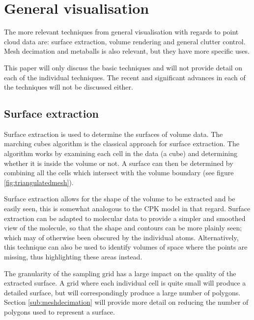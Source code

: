 

\section{General visualisation}
\label{sec:generalvis}


The more relevant techniques from general visualisation with regards to point
cloud data are: surface extraction, volume rendering and general clutter
control. Mesh decimation and metaballs is also relevant, but they have more
specific uses.

This paper will only discuss the basic techniques and will not provide detail
on each of the individual techniques. The recent and significant advances in
each of the techniques will not be discussed either.


\subsection{Surface extraction}
\label{sub:surfaceextraction}

Surface extraction is used to determine the surfaces of volume data. The
marching cubes algorithm \citep{lorensen87} is the classical approach for
surface extraction. The algorithm works by examining each cell in the data (a
cube) and determining whether it is inside the volume or not. A surface can
then be determined by combining all the cells which intersect with the volume
boundary (see figure \ref{fig:triangulatedmesh}).

Surface extraction allows for the shape of the volume to be extracted and be
easily seen, this is somewhat analogous to the CPK model in that regard.
Surface extraction can be adapted to molecular data to provide a simpler and
smoothed view of the molecule, so that the shape and contours can be more
plainly seen; which may of otherwise been obscured by the individual atoms.
Alternatively, this technique can also be used to identify volumes of space
where the points are missing, thus highlighting these areas instead.

The granularity of the sampling grid has a large impact on the quality of the
extracted surface. A grid where each individual cell is quite small will
produce a detailed surface, but will correspondingly produce a large number of
polygons. Section \ref{sub:meshdecimation} will provide more detail on reducing
the number of polygons used to represent a surface.


